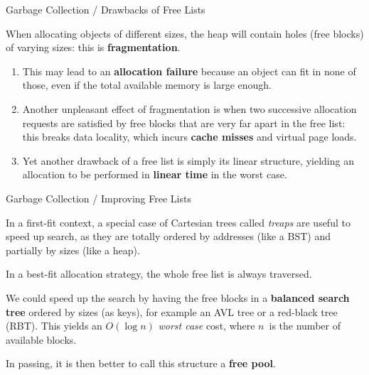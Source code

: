 \documentclass[compress,dvipdfmx]{beamer}
\begin{document}
%
\begin{frame}{Garbage Collection / Drawbacks of Free Lists}

   When allocating objects of different sizes, the heap will contain
   holes (free blocks) of varying sizes: this is
   \textbf{fragmentation}.
   \begin{enumerate}

     \item This may lead to an \textbf{allocation failure} because an
       object can fit in none of those, even if the total available
       memory is large enough.

     \item Another unpleasant effect of fragmentation is when two
       successive allocation requests are satisfied by free blocks
       that are very far apart in the free list: this breaks data
       locality, which incurs \textbf{cache misses} and virtual page
       loads.

     \item Yet another drawback of a free list is simply its linear
       structure, yielding an allocation to be performed in
       \textbf{linear time} in the worst case.

   \end{enumerate}

\end{frame}

%
\begin{frame}{Garbage Collection / Improving Free Lists}

  In a first\hyp{}fit context, a special case of Cartesian trees
  called \emph{treaps} are useful to speed up search, as they are
  totally ordered by addresses (like a BST) and partially by sizes
  (like a heap).

  \bigskip

  In a best\hyp{}fit allocation strategy, the whole free list is
  always traversed.

  \bigskip

  We could speed up the search by having the free blocks in a
  \textbf{balanced search tree} ordered by sizes (as keys), for
  example an AVL tree or a red\hyp{}black tree (RBT). This yields an
  \(O(\log n)\) \emph{worst case} cost, where \(n\)~is the number of
  available blocks.

  \bigskip

  In passing, it is then better to call this structure a \textbf{free
    pool}.

\end{frame}
\end{document}
